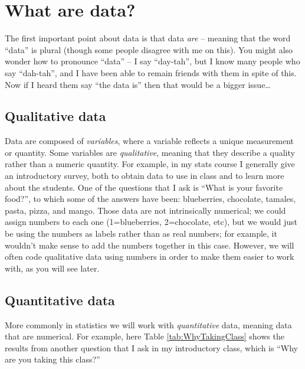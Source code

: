 \documentclass[12pt,]{book}
\theoremstyle{definition}
\theoremstyle{definition}
\theoremstyle{definition}
\theoremstyle{remark}
\begin{document}
\hypertarget{what-are-data}{%
\section{What are data?}\label{what-are-data}}

The first important point about data is that data \emph{are} -- meaning that the word ``data'' is plural (though some people disagree with me on this). You might also wonder how to pronounce ``data'' -- I say ``day-tah'', but I know many people who say ``dah-tah'', and I have been able to remain friends with them in spite of this. Now if I heard them say ``the data is'' then that would be a bigger issue\ldots{}

\hypertarget{qualitative-data}{%
\subsection{Qualitative data}\label{qualitative-data}}

Data are composed of \emph{variables}, where a variable reflects a unique measurement or quantity. Some variables are \emph{qualitative}, meaning that they describe a quality rather than a numeric quantity. For example, in my stats course I generally give an introductory survey, both to obtain data to use in class and to learn more about the students. One of the questions that I ask is ``What is your favorite food?'', to which some of the answers have been: blueberries, chocolate, tamales, pasta, pizza, and mango. Those data are not intrinsically numerical; we could assign numbers to each one (1=blueberries, 2=chocolate, etc), but we would just be using the numbers as labels rather than as real numbers; for example, it wouldn't make sense to add the numbers together in this case. However, we will often code qualitative data using numbers in order to make them easier to work with, as you will see later.

\hypertarget{quantitative-data}{%
\subsection{Quantitative data}\label{quantitative-data}}

More commonly in statistics we will work with \emph{quantitative} data, meaning data that are numerical. For example, here Table \ref{tab:WhyTakingClass} shows the results from another question that I ask in my introductory class, which is ``Why are you taking this class?''
\end{document}
